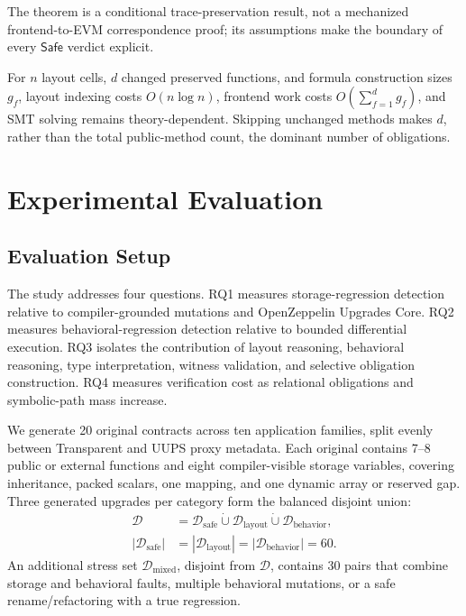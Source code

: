 \documentclass[runningheads]{llncs}
\newcommand{\Safe}{\mathsf{Safe}}
\begin{document}
The theorem is a conditional trace-preservation result, not a mechanized frontend-to-EVM correspondence proof; its assumptions make the boundary of every \(\Safe\) verdict explicit.

For \(n\) layout cells, \(d\) changed preserved functions, and formula construction sizes \(g_f\), layout indexing costs \(O(n\log n)\), frontend work costs \(O(\sum_{f=1}^{d}g_f)\), and SMT solving remains theory-dependent.  Skipping unchanged methods makes \(d\), rather than the total public-method count, the dominant number of obligations.

\section{Experimental Evaluation}
\label{sec:evaluation}

\subsection{Evaluation Setup}
\label{subsec:eval-design}

The study addresses four questions. RQ1 measures storage-regression detection relative to compiler-grounded mutations and OpenZeppelin Upgrades Core. RQ2 measures behavioral-regression detection relative to bounded differential execution. RQ3 isolates the contribution of layout reasoning, behavioral reasoning, type interpretation, witness validation, and selective obligation construction. RQ4 measures verification cost as relational obligations and symbolic-path mass increase.

We generate 20 original contracts across ten application families, split evenly between Transparent and UUPS proxy metadata. Each original contains 7--8 public or external functions and eight compiler-visible storage variables, covering inheritance, packed scalars, one mapping, and one dynamic array or reserved gap. Three generated upgrades per category form the balanced disjoint union:
\begin{equation}
\begin{aligned}
\mathcal{D} &= \mathcal{D}_{\mathrm{safe}}\mathbin{\dot\cup}\mathcal{D}_{\mathrm{layout}}\mathbin{\dot\cup}\mathcal{D}_{\mathrm{behavior}},\\
|\mathcal{D}_{\mathrm{safe}}| &= |\mathcal{D}_{\mathrm{layout}}| = |\mathcal{D}_{\mathrm{behavior}}| = 60.
\end{aligned}
\label{eq:dataset-partition}
\end{equation}
An additional stress set \(\mathcal{D}_{\mathrm{mixed}}\), disjoint from \(\mathcal{D}\), contains 30 pairs that combine storage and behavioral faults, multiple behavioral mutations, or a safe rename/refactoring with a true regression.
\end{document}
